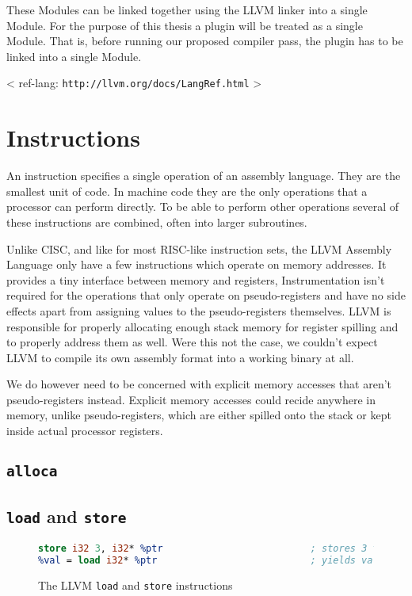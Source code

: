 These Modules can be linked together using the LLVM linker into a single Module.
For the purpose of this thesis a plugin will be treated as a single Module. That
is, before running our proposed compiler pass, the plugin has to be linked into
a single Module.

< ref-lang: \texttt{http://llvm.org/docs/LangRef.html} >


\section {Instructions}

An instruction specifies a single operation of an assembly language. They are
the smallest unit of code. In machine code they are the only operations that a
processor can perform directly. To be able to perform other operations several
of these instructions are combined, often into larger subroutines.

Unlike CISC, and like for most RISC-like instruction sets, the LLVM Assembly
Language only have a few instructions which operate on memory addresses. It
provides a tiny interface between memory and registers, Instrumentation isn't
required for the operations that only operate on pseudo-registers and have no
side effects apart from assigning values to the pseudo-registers themselves.
LLVM is responsible for properly allocating enough stack memory for register
spilling and to properly address them as well. Were this not the case, we
couldn't expect LLVM to compile its own assembly format into a working binary at
all.

We do however need to be concerned with explicit memory accesses that aren't
pseudo-registers instead. Explicit memory accesses could recide anywhere in
memory, unlike pseudo-registers, which are either spilled onto the stack or kept
inside actual processor registers.

\subsection {\texttt{alloca}}

\subsection {\texttt{load} and \texttt{store}}

\begin{figure}[ht]
\begin{lstlisting}[language=llvm]
store i32 3, i32* %ptr                          ; stores 3 to *ptr
%val = load i32* %ptr                           ; yields val = *ptr
\end{lstlisting}
\caption{The LLVM \texttt{load} and \texttt{store} instructions}
\end{figure}

